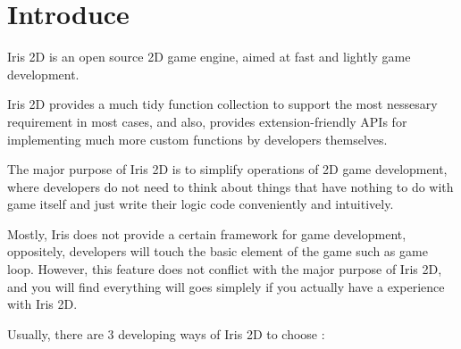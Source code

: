 \hypertarget{index_intro_sec}{}\section{Introduce}\label{index_intro_sec}
Iris 2D is an open source 2D game engine, aimed at fast and lightly game development.

Iris 2D provides a much tidy function collection to support the most nessesary requirement in most cases, and also, provides extension-\/friendly A\+P\+Is for implementing much more custom functions by developers themselves.

The major purpose of Iris 2D is to simplify operations of 2D game development, where developers do not need to think about things that have nothing to do with game itself and just write their logic code conveniently and intuitively.

Mostly, Iris does not provide a certain framework for game development, oppositely, developers will touch the basic element of the game such as game loop. However, this feature does not conflict with the major purpose of Iris 2D, and you will find everything will goes simplely if you actually have a experience with Iris 2D.

Usually, there are 3 developing ways of Iris 2D to choose \+:

